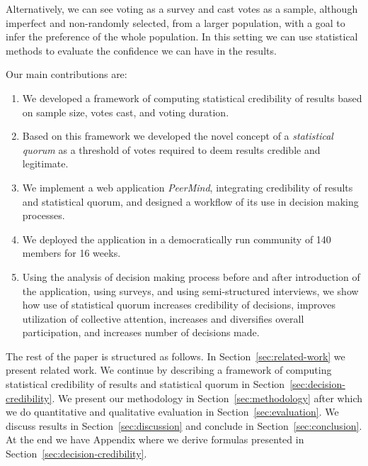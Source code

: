 \documentclass[format=acmsmall, review=true, screen=true, anonymous=true]{acmart}
\begin{document}
Alternatively, we can see voting as a survey and cast votes as a sample, although imperfect
and non-randomly selected, from a larger population, with a goal to infer the preference
of the whole population. In this setting we can use statistical methods to evaluate the
confidence we can have in the results.


Our main contributions are:

\begin{enumerate}
\item We developed a framework of computing statistical credibility of results
based on sample size, votes cast, and voting duration.
\item Based on this framework we developed the novel concept of a \emph{statistical quorum} as a threshold of votes required to deem results credible and legitimate.
\item We implement a web application \emph{PeerMind},
integrating credibility of results and statistical quorum, and designed
a workflow of its use in decision making processes.
\item We deployed the application in a democratically run community of 140
members for 16 weeks.
\item Using the analysis of decision making process before and after introduction
of the application, using surveys, and using semi-structured interviews, we show
how use of statistical quorum increases credibility of decisions,
improves utilization of collective attention, increases and diversifies overall participation,
and increases number of decisions made.
\end{enumerate}

The rest of the paper is structured as follows. In Section~\ref{sec:related-work} we
present related work. We continue by describing a framework of computing statistical
credibility of results and statistical quorum in Section~\ref{sec:decision-credibility}.
We present our methodology in Section~\ref{sec:methodology} after which we do
quantitative and qualitative evaluation in Section~\ref{sec:evaluation}. We discuss results in
Section~\ref{sec:discussion} and conclude in Section~\ref{sec:conclusion}. At the end we
have Appendix where we derive formulas presented in Section~\ref{sec:decision-credibility}.
\end{document}
